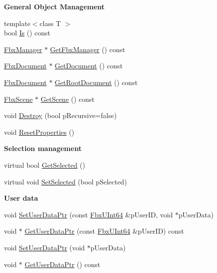 \begin{Indent}\textbf{ General Object Management}\par
\begin{DoxyCompactItemize}
\item 
{\footnotesize template$<$class T $>$ }\\bool \hyperlink{class_fbx_object_a65e47d62ed950247cd097b3b505d7b48}{Is} () const
\item 
\hyperlink{class_fbx_manager}{Fbx\+Manager} $\ast$ \hyperlink{class_fbx_object_aa9871c290d977c2ef1c268193699863c}{Get\+Fbx\+Manager} () const
\item 
\hyperlink{class_fbx_document}{Fbx\+Document} $\ast$ \hyperlink{class_fbx_object_a4751c8d1f4156ed658f5b3473cad367a}{Get\+Document} () const
\item 
\hyperlink{class_fbx_document}{Fbx\+Document} $\ast$ \hyperlink{class_fbx_object_a35553dcf1f5290c92b10c7246a5d685b}{Get\+Root\+Document} () const
\item 
\hyperlink{class_fbx_scene}{Fbx\+Scene} $\ast$ \hyperlink{class_fbx_object_a2e76cc1e34a8474a4dddd7dee28e04c2}{Get\+Scene} () const
\item 
void \hyperlink{class_fbx_object_a7b49e6a0c17132cd7e2e7e8485a08915}{Destroy} (bool p\+Recursive=false)
\item 
void \hyperlink{class_fbx_object_af8626c123cf302297bdecb4c8d62db99}{Reset\+Properties} ()
\end{DoxyCompactItemize}
\end{Indent}
\begin{Indent}\textbf{ Selection management}\par
\begin{DoxyCompactItemize}
\item 
virtual bool \hyperlink{class_fbx_object_ade0dddb02e39f6823d0bea6071ef4410}{Get\+Selected} ()
\item 
virtual void \hyperlink{class_fbx_object_ab61c3e576aaf899deda673702c0a1b79}{Set\+Selected} (bool p\+Selected)
\end{DoxyCompactItemize}
\end{Indent}
\begin{Indent}\textbf{ User data}\par
\begin{DoxyCompactItemize}
\item 
void \hyperlink{class_fbx_object_ac37f77806bfd54d6a41ca6158768deb0}{Set\+User\+Data\+Ptr} (const \hyperlink{fbxtypes_8h_a9beeca85cdc9941e912fe9eac7709b53}{Fbx\+U\+Int64} \&p\+User\+ID, void $\ast$p\+User\+Data)
\item 
void $\ast$ \hyperlink{class_fbx_object_a434f9f31f49ddea0ce7248a75bbed30a}{Get\+User\+Data\+Ptr} (const \hyperlink{fbxtypes_8h_a9beeca85cdc9941e912fe9eac7709b53}{Fbx\+U\+Int64} \&p\+User\+ID) const
\item 
void \hyperlink{class_fbx_object_af52325b1b5f2f1f5884d5d14d80c1922}{Set\+User\+Data\+Ptr} (void $\ast$p\+User\+Data)
\item 
void $\ast$ \hyperlink{class_fbx_object_ae1580cc0f041cf81bf0a3a96c4e00554}{Get\+User\+Data\+Ptr} () const
\end{DoxyCompactItemize}
\end{Indent}
